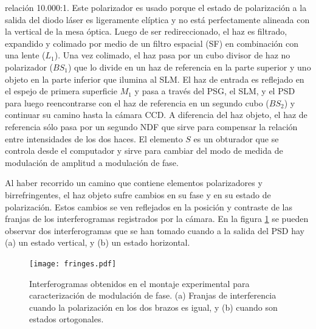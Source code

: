 relación  10.000:1. Este polarizador es usado porque el estado de
polarización a la salida del diodo láser es ligeramente elíptica y no
está perfectamente alineada con la vertical de la mesa óptica. 
Luego de ser redireccionado, el haz es filtrado, expandido y colimado
por medio de un filtro espacial (SF) en combinación con una lente
($L_1$). Una vez colimado, el haz pasa por un cubo divisor de haz no
polarizador ($BS_1$) que lo divide en un haz de referencia en la parte
superior y uno objeto en la parte inferior que ilumina
al SLM. El haz de entrada es reflejado en el espejo de primera
superficie $M_1$ y pasa a través del PSG, el SLM, y el PSD para luego
reencontrarse con el haz de referencia en un segundo cubo ($BS_2$) y
continuar su camino hasta la cámara CCD. A diferencia del haz objeto,
el haz de referencia sólo pasa por un segundo NDF que sirve para
compensar la relación entre intensidades de los dos haces. El elemento
$S$ es un obturador que se controla desde el computador y sirve para cambiar
del modo de medida de modulación de amplitud a modulación de fase.  

Al haber recorrido un camino que contiene elementos polarizadores y
birrefringentes, el haz objeto sufre cambios en su fase y en su estado
de polarización. Estos cambios se ven reflejados en la posición y
contraste de las franjas de los interferogramas registrados por la
cámara. En la figura \ref{fig:fringes} se pueden observar dos
interferogramas que se han tomado cuando a la salida del PSD hay (a)
un estado vertical, y (b) un estado horizontal.  
\begin{figure}[h!]
\centering
\texttt{[image: fringes.pdf]}
\caption[Interferogramas obtenidos en el montaje experimental para
caracterización de modulación de fase]{Interferogramas obtenidos en el montaje experimental para
caracterización de modulación de fase. (a) Franjas de interferencia
cuando la polarización en los dos brazos es igual, y (b) cuando son
estados ortogonales.}
\label{fig:fringes}
\end{figure}

